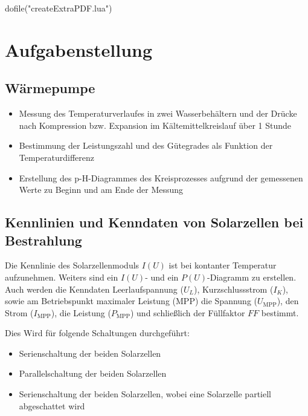 \documentclass[12pt,english,ngerman]{scrartcl}
\begin{document}
\begin{luacode*}
	dofile("createExtraPDF.lua")
\end{luacode*}

% 
\tableofcontents

\newpage

\section{Aufgabenstellung\label{Auf}}

\subsection{Wärmepumpe}

\begin{itemize}
	\item Messung des Temperaturverlaufes in zwei Wasserbehältern und der Drücke nach
	      Kompression bzw. Expansion im Kältemittelkreislauf über 1 Stunde
	\item Bestimmung der Leistungszahl und des Gütegrades als Funktion der
	      Temperaturdifferenz
	\item Erstellung des p-H-Diagrammes des Kreisprozesses aufgrund der gemessenen Werte
	      zu Beginn und am Ende der Messung
\end{itemize}
\subsection{Kennlinien und Kenndaten von Solarzellen bei Bestrahlung}

Die Kennlinie des Solarzellenmoduls $I(U)$ ist bei kontanter Temperatur
aufzunehmen. Weiters sind ein $I(U)$- und ein $P(U)$-Diagramm zu erstellen.
Auch werden die Kenndaten Leerlaufspannung ($U_L$), Kurzschlussstrom ($I_K$),
sowie am Betriebspunkt maximaler Leistung (MPP) die Spannung ($U_\text{MPP}$),
den Strom ($I_\text{MPP}$), die Leistung ($P_\text{MPP}$) und schließlich der
Füllfaktor $FF$ bestimmt.

Dies Wird für folgende Schaltungen durchgeführt:

\begin{itemize}
	\item Serienschaltung der beiden Solarzellen
	\item Parallelschaltung der beiden Solarzellen
	\item Serienschaltung der beiden Solarzellen, wobei eine Solarzelle partiell
	      abgeschattet wird
\end{itemize}
\end{document}
